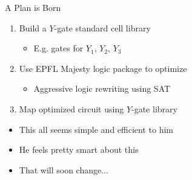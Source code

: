 \begin{frame}[t]{}
	\Huge A Plan is Born
	\normalsize
	\begin{enumerate}
		\item Build a $Y$-gate standard cell library
			\begin{itemize}
				\item E.g. gates for $Y_1$, $Y_2$, $Y_3$
			\end{itemize}
		\item Use EPFL Majesty logic package to optimize
			\begin{itemize}
				\item Aggressive logic rewriting using SAT
			\end{itemize}
		\item Map optimized circuit using $Y$-gate library
	\end{enumerate}
	\begin{itemize}
		\item This all seems simple and efficient to him
		\item He feels pretty smart about this
		\item That will soon change...
	\end{itemize}
\end{frame}

